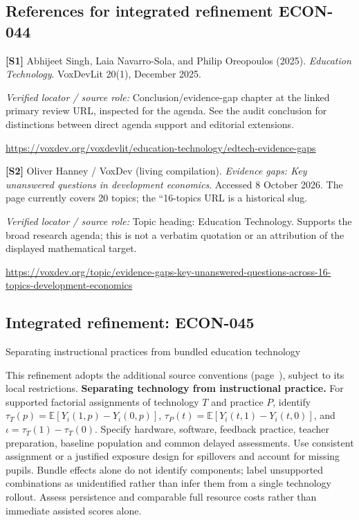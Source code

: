 \documentclass[11pt,a4paper]{article}
\begin{document}
\subsection*{References for integrated refinement ECON-044}
{\footnotesize\raggedright
\par\noindent\textbf{[S1]} Abhijeet Singh, Laia Navarro-Sola, and Philip Oreopoulos (2025). \emph{Education Technology}. VoxDevLit 20(1), December 2025.\par \textit{Verified locator / source role:} Conclusion/evidence-gap chapter at the linked primary review URL, inspected for the agenda. See the audit conclusion for distinctions between direct agenda support and editorial extensions.\par \url{https://voxdev.org/voxdevlit/education-technology/edtech-evidence-gaps}\par\smallskip
\par\noindent\textbf{[S2]} Oliver Hanney / VoxDev (living compilation). \emph{Evidence gaps: Key unanswered questions in development economics}. Accessed 8 October 2026. The page currently covers 20 topics; the ``16-topics URL is a historical slug.\par \textit{Verified locator / source role:} Topic heading: Education Technology. Supports the broad research agenda; this is not a verbatim quotation or an attribution of the displayed mathematical target.\par \url{https://voxdev.org/topic/evidence-gaps-key-unanswered-questions-across-16-topics-development-economics}\par\smallskip
}

\subsection*{Integrated refinement: ECON-045}
{\sffamily\small\color{muted}Separating instructional practices from bundled education technology\par}
This refinement adopts the additional source conventions
(page~\pageref{audited:conventions}), subject to its local restrictions.
\textbf{Separating technology from instructional practice.}
For supported factorial assignments of technology $T$ and practice $P$,
identify $\tau_T(p)=\mathbb E[Y_i(1,p)-Y_i(0,p)]$,
$\tau_P(t)=\mathbb E[Y_i(t,1)-Y_i(t,0)]$, and
$\iota=\tau_T(1)-\tau_T(0)$. Specify hardware, software, feedback practice,
teacher preparation, baseline population and common delayed assessments.
Use consistent assignment or a justified exposure design for spillovers and
account for missing pupils. Bundle effects alone do not identify components;
label unsupported combinations as unidentified rather than infer them from a
single technology rollout. Assess persistence and comparable full resource
costs rather than immediate assisted scores alone.
\end{document}
